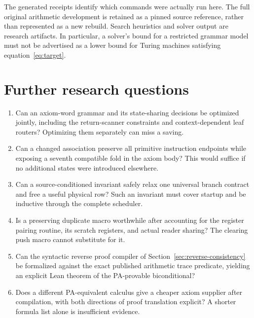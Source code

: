 \documentclass[11pt,letterpaper]{article}
\begin{document}
The generated receipts identify which commands were actually run here.
The full original arithmetic development is retained as a pinned source
reference, rather than represented as a new rebuild. Search heuristics and
solver output are research artifacts. In particular, a solver's bound
for a restricted grammar model must not be advertised as a lower bound
for Turing machines satisfying equation~\eqref{eq:target}.

\clearpage
\section{Further research questions}

\begin{enumerate}
\item Can an axiom-word grammar and its state-sharing decisions be optimized
  jointly, including the return-scanner constraints and context-dependent
  leaf routers? Optimizing them separately can miss a saving.
\item Can a changed association preserve all primitive instruction
  endpoints while exposing a seventh compatible fold in the axiom body?
  This would suffice if no additional states were introduced elsewhere.
\item Can a source-conditioned invariant safely relax one universal
  branch contract and free a useful physical row? Such an invariant must
  cover startup and be inductive through the complete scheduler.
\item Is a preserving duplicate macro worthwhile after accounting for
  the register pairing routine, its scratch registers, and actual reader
  sharing? The clearing push macro cannot substitute for it.
\item Can the syntactic reverse proof compiler of
  Section~\ref{sec:reverse-consistency} be formalized against the exact
  published arithmetic trace predicate, yielding an explicit Lean theorem
  of the PA-provable biconditional?
\item Does a different PA-equivalent calculus give a cheaper axiom supplier
  after compilation, with both directions of proof translation explicit?
  A shorter formula list alone is insufficient evidence.
\end{enumerate}
\end{document}
